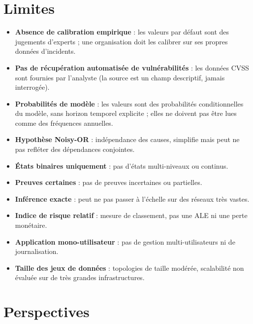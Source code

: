 \documentclass[12pt,a4paper]{article}
\newcommand{\forcereset}[1]{}
\begin{document}
\section{Limites}
\forcereset{6}

\begin{itemize}[leftmargin=1.2cm, itemsep=0.2\baselineskip]
    \item \textbf{Absence de calibration empirique} : les valeurs par défaut sont des jugements d'experts ; une organisation doit les calibrer sur ses propres données d'incidents.
    \item \textbf{Pas de récupération automatisée de vulnérabilités} : les données CVSS sont fournies par l'analyste (la source est un champ descriptif, jamais interrogée).
    \item \textbf{Probabilités de modèle} : les valeurs sont des probabilités conditionnelles du modèle, sans horizon temporel explicite ; elles ne doivent pas être lues comme des fréquences annuelles.
    \item \textbf{Hypothèse Noisy-OR} : indépendance des causes, simplifie mais peut ne pas refléter des dépendances conjointes.
    \item \textbf{États binaires uniquement} : pas d'états multi-niveaux ou continus.
    \item \textbf{Preuves certaines} : pas de preuves incertaines ou partielles.
    \item \textbf{Inférence exacte} : peut ne pas passer à l'échelle sur des réseaux très vastes.
    \item \textbf{Indice de risque relatif} : mesure de classement, pas une ALE ni une perte monétaire.
    \item \textbf{Application mono-utilisateur} : pas de gestion multi-utilisateurs ni de journalisation.
    \item \textbf{Taille des jeux de données} : topologies de taille modérée, scalabilité non évaluée sur de très grandes infrastructures.
\end{itemize}

\section{Perspectives}
\forcereset{6}
\end{document}
